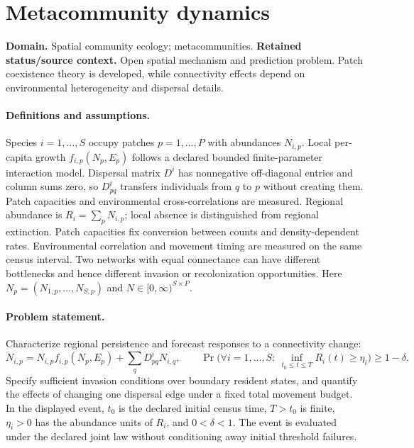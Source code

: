 \documentclass[11pt]{article}
\begin{document}
\section*{Metacommunity dynamics}
\label{prob:196}
\label{rank:171}
\par\smallskip

\noindent\textbf{Domain.} Spatial community ecology; metacommunities. \quad \textbf{Retained status/source context.} Open spatial mechanism and prediction problem. Patch coexistence theory is developed, while connectivity effects depend on environmental heterogeneity and dispersal details.
\paragraph{Definitions and assumptions.} Species $i=1,\ldots,S$ occupy patches $p=1,\ldots,P$ with abundances $N_{i,p}$. Local per-capita growth $f_{i,p}(N_p,E_p)$ follows a declared bounded finite-parameter interaction model. Dispersal matrix $D^i$ has nonnegative off-diagonal entries and column sums zero, so $D^i_{pq}$ transfers individuals from $q$ to $p$ without creating them. Patch capacities and environmental cross-correlations are measured. Regional abundance is $R_i=\sum_pN_{i,p}$; local absence is distinguished from regional extinction. Patch capacities fix conversion between counts and density-dependent rates. Environmental correlation and movement timing are measured on the same census interval. Two networks with equal connectance can have different bottlenecks and hence different invasion or recolonization opportunities. Here $N_p=(N_{1,p},\ldots,N_{S,p})$ and $N\in[0,\infty)^{S\times P}$.
\paragraph{Problem statement.} Characterize regional persistence and forecast responses to a connectivity change:
\[
 \dot N_{i,p}=N_{i,p}f_{i,p}(N_p,E_p)+\sum_qD^i_{pq}N_{i,q},
 \qquad
 \Pr\bigl(\forall i=1,\ldots,S:\ \inf_{t_0\le t\le T}R_i(t)\ge\eta_i\bigr)\ge1-\delta.
\]
Specify sufficient invasion conditions over boundary resident states, and quantify the effects of changing one dispersal edge under a fixed total movement budget. In the displayed event, $t_0$ is the declared initial census time, $T>t_0$ is finite, $\eta_i>0$ has the abundance units of $R_i$, and $0<\delta<1$. The event is evaluated under the declared joint law without conditioning away initial threshold failures.
\end{document}
